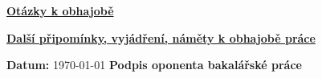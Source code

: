 \documentclass[a4paper,12pt]{article}
\begin{document}
\vskip15pt
\uline{\textbf{Otázky k obhajobě}}
\vskip36pt

\uline{\textbf{Další připomínky, vyjádření, náměty k obhajobě práce}}
\vskip45pt

\textbf{Datum:} \quad \today
\vskip10pt
\hfill \textbf{Podpis oponenta bakalářské práce}

    
\end{document}
